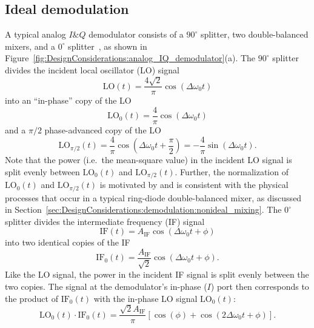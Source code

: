 \subsection{Ideal demodulation}
\label{sec:DesignConsiderations:demodulation:ideal}
A typical analog $I\&Q$ demodulator consists of
a $90^{\circ}$ splitter,
two double-balanced mixers, and
a $0^{\circ}$ splitter~\cite{minicircuits_modulators}, as shown in
Figure~\ref{fig:DesignConsiderations:analog_IQ_demodulator}(a).
The $90^{\circ}$ splitter divides the incident local oscillator (LO) signal
\begin{equation}
  \text{LO}(t) = \frac{4 \sqrt{2}}{\pi} \cos(\Delta\omega_0 t)
\end{equation}
into an ``in-phase'' copy of the LO
\begin{equation}
  \text{LO}_0(t)
  =
  \frac{4}{\pi} \cos(\Delta\omega_0 t)
\end{equation}
and a $\pi / 2$ phase-advanced copy of the LO
\begin{equation}
  \text{LO}_{\pi / 2}(t)
  =
  \frac{4}{\pi} \cos\left( \Delta\omega_0 t + \frac{\pi}{2} \right)
  =
  -\frac{4}{\pi} \sin(\Delta\omega_0 t).
\end{equation}
Note that the power (i.e.\ the mean-square value) in the incident LO signal
is split evenly between $\text{LO}_0(t)$ and $\text{LO}_{\pi / 2}(t)$.
Further, the normalization of $\text{LO}_0(t)$ and $\text{LO}_{\pi / 2}(t)$
is motivated by and is consistent with the physical processes
that occur in a typical ring-diode double-balanced mixer, as discussed in
Section~\ref{sec:DesignConsiderations:demodulation:nonideal_mixing}.
The $0^{\circ}$ splitter divides the intermediate frequency (IF) signal
\begin{equation}
  \text{IF}(t) = A_{\text{IF}} \cos(\Delta\omega_0 t + \phi)
  \label{eq:DesignConsiderations:IF_perfect_sinusoid}
\end{equation}
into two identical copies of the IF
\begin{equation}
  \text{IF}_0(t)
  =
  \frac{A_{\text{IF}}}{\sqrt{2}} \cos(\Delta\omega_0 t + \phi).
  \label{eq:DesignConsiderations:split_IF}
\end{equation}
Like the LO signal, the power in the incident IF signal
is split evenly between the two copies.
The signal at the demodulator's in-phase ($I$) port
then corresponds to the product of
$\text{IF}_0(t)$ with the in-phase LO signal $\text{LO}_0(t)$:
\begin{equation}
  \text{LO}_0(t) \cdot \text{IF}_0(t)
  =
  \frac{\sqrt{2} A_{\text{IF}}}{\pi}
  \left[
    \cos(\phi) + \cos(2 \Delta\omega_0 t + \phi)
  \right].
\end{equation}
